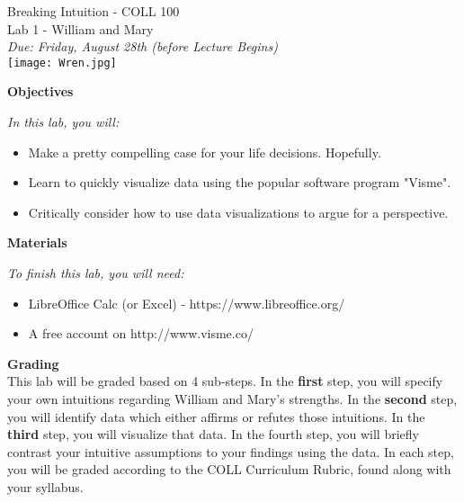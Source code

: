 \documentclass{article}
\begin{document}
\begin{center}
{\Huge Breaking Intuition - COLL 100}\\
\vspace{5mm}
{\huge Lab 1 - William and Mary}\\ %
\vspace{5mm}
\textit{Due: Friday, August 28th (before Lecture Begins)}\\
\vspace{25mm}
\texttt{[image: Wren.jpg]}
\end{center}



\newpage


\textbf{Objectives}

\textit{In this lab, you will:}
\begin{itemize}
\item Make a pretty compelling case for your life decisions.  Hopefully. 
\item Learn to quickly visualize data using the popular software program "Visme". 
\item Critically consider how to use data visualizations to argue for a perspective.
\end{itemize}

\vspace{3mm}
\textbf{Materials}

\textit{To finish this lab, you will need:}
\begin{itemize}
\item LibreOffice Calc (or Excel) - https://www.libreoffice.org/
\item A free account on http://www.visme.co/
\end{itemize}

\vspace{3mm}
\textbf{Grading}\\
This lab will be graded based on 4 sub-steps.  In the \textbf{first} step, you will specify your own intuitions regarding William and Mary's strengths.  In the \textbf{second} step, you will identify data which either affirms or refutes those intuitions.  In the \textbf{third} step, you will visualize that data.  In the fourth step, you will briefly contrast your intuitive assumptions to your findings using the data.  In each step, you will be graded according to the COLL Curriculum Rubric, found along with your syllabus.
\end{document}
